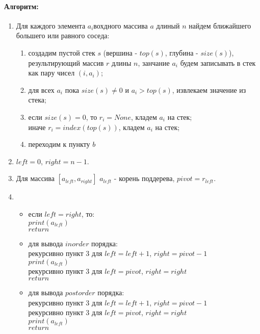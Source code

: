 \documentclass[12pt]{article}
\begin{document}
\paragraph{Алгоритм:}

\begin{enumerate}

\item Для каждого элемента $a_i$вохдного массива $a$ длиный $n$ найдем ближайшего большего или равного соседа:

	\begin{enumerate}
	
	\item создадим пустой стек $s$ (вершина - $top(s)$, глубина - $size(s)$), результирующий массив $r$ длины $n$, занчание $a_i$ будем записывать в стек как пару чисел $(i, a_i)$;
	
	\item для всех $a_i$ пока $size(s) \neq 0$ и $a_i > top(s)$, извлекаем значение из стека;

	\item если  $size(s) = 0$, то $r_i = None$, кладем $a_i$ на стек;\\
		  иначе $r_i = index(top(s))$, кладем $a_i$ на стек;
		 
	\item переходим к пункту $b$
	
	\end{enumerate}
	

\item $left = 0$, $right = n - 1$.

\item Для массива $[a_{left}, a_{right}]$ $a_{left}$ - корень поддерева, $pivot = r_{left}$.

\item 	\begin{itemize}

		\item если $left = right$, то:\\
		$print(a_{left})$\\
		$return$

		\item для вывода $inorder$ порядка:\\
		рекурсивно пункт 3 для $left = left + 1$, $right = pivot - 1$\\
		$print(a_{left})$\\
		рекурсивно пункт 3 для $left = pivot$, $right = right$\\
		$return$
		
		\item для вывода $postorder$ порядка:\\
		рекурсивно пункт 3 для $left = left + 1$, $right = pivot - 1$\\		
		рекурсивно пункт 3 для $left = pivot$, $right = right$\\
		$print(a_{left})$\\
		$return$
				
		\end{itemize}
	
\end{enumerate}
		
\end{document}
